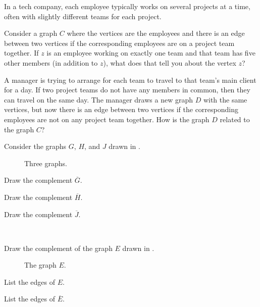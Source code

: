 \begin{exer} [\exerP] %
\label{exer_comp_model}
    In a tech company, each employee typically works on several projects at a time, often with slightly different teams for each project.  
        \begin{exerpart}
            \item Consider a graph $C$ where the vertices are the employees and there is an edge between two vertices if the corresponding employees are on a project team together. If $z$ is an employee working on exactly one team and that team has five other members (in addition to $z$), what does that tell you about the vertex $z$?
            \item A manager is trying to arrange for each team to travel to that team's main client for a day.  If two project teams do not have any members in common, then they can travel on the same day.  The manager draws a new graph $D$ with the same vertices, but now there is an edge between two vertices if the corresponding employees are not on any project team together.  How is the graph $D$ related to the graph $C$?
        \end{exerpart}
\end{exer}

\begin{exer} [\exerP] %
\label{exer_comp_easy}
     Consider the graphs $G$, $H$, and $J$ drawn in .
     
         \begin{figure}[hbtp]
             \centering
             
             \caption{Three graphs.}
             \label{fig_3comp}
         \end{figure}

         \begin{exerpart}
             \item Draw the complement $\overline{G}$.
             \item Draw the complement $\overline{H}$.
             \item Draw the complement $\overline{J}$.
         \end{exerpart}
\end{exer}

\begin{exer}[\exerP] %
\label{exer_graph_elephant}
~
    \begin{exerpart}
        \item Draw the complement of the graph $E$ drawn in .

            \begin{figure}[hbtp]
                \centering
                
                \caption{The graph $E$.}
                \label{fig_elephant}
            \end{figure}
        \item List the edges of $E$.
        \item List the edges of $\overline{E}$.
    \end{exerpart}
\end{exer}

